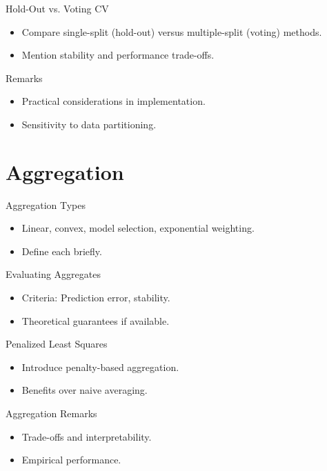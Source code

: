 \documentclass{beamer}
\newcommand{\0}{\emptyset}
\newcommand{\1}{\mathmybb{1}}
\begin{document}
\begin{frame}{Hold-Out vs. Voting CV}
  \begin{itemize}
    \item Compare single-split (hold-out) versus multiple-split (voting) methods.
    \item Mention stability and performance trade-offs.
  \end{itemize}
\end{frame}

\begin{frame}{Remarks}
  \begin{itemize}
    \item Practical considerations in implementation.
    \item Sensitivity to data partitioning.
  \end{itemize}
\end{frame}

\section{Aggregation}
\begin{frame}{Aggregation Types}
  \begin{itemize}
    \item Linear, convex, model selection, exponential weighting.
    \item Define each briefly.
  \end{itemize}
\end{frame}

\begin{frame}{Evaluating Aggregates}
  \begin{itemize}
    \item Criteria: Prediction error, stability.
    \item Theoretical guarantees if available.
  \end{itemize}
\end{frame}

\begin{frame}{Penalized Least Squares}
  \begin{itemize}
    \item Introduce penalty-based aggregation.
    \item Benefits over naive averaging.
  \end{itemize}
\end{frame}

\begin{frame}{Aggregation Remarks}
  \begin{itemize}
    \item Trade-offs and interpretability.
    \item Empirical performance.
  \end{itemize}
\end{frame}
\end{document}

